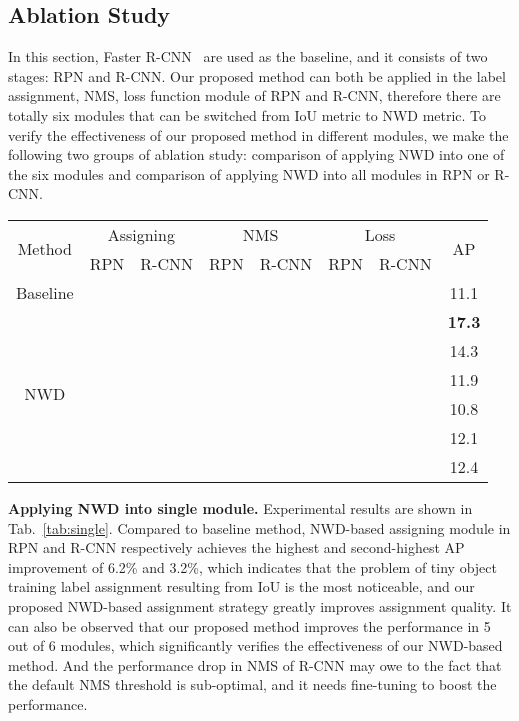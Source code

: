 \documentclass{article}
\begin{document}
\subsection{Ablation Study}
 In this section, Faster R-CNN~\cite{Faster-R-CNN_2015_NIPS} are used as the baseline, and it consists of two stages: RPN and R-CNN. Our proposed method can both be applied in the label assignment, NMS, loss function module of RPN and R-CNN, therefore there are totally six modules that can be switched from IoU metric to NWD metric. To verify the effectiveness of our proposed method in different modules, we make the following two groups of ablation study: comparison of applying NWD into one of the six modules and comparison of applying NWD into all modules in RPN or R-CNN.

\begin{table*}[t]
	\centering
\setlength{\belowcaptionskip}{0.2cm}
	\caption{Ablation experiments when NWD is applied to single module.}
	\begin{tabular}{|c|cc|cc|cc|c|}  
	\hline
	\multirow{2}{*}{Method}  & \multicolumn{2}{c|}{Assigning}  & \multicolumn{2}{c|}{NMS}  & \multicolumn{2}{c|}{Loss} & \multirow{2}{*}{AP} \\
	&  RPN & R-CNN & RPN & R-CNN & RPN & R-CNN & \\
	\hline
	Baseline & & & & & & & 11.1 \\
	\hline
	\multirow{6}{*}{NWD}  & \checkmark &  &  &  &  &  & \textbf{17.3} \\
	                      &  & \checkmark &  &  &  &  & 14.3 \\
	                      &  &  & \checkmark &  &  &  & 11.9 \\
	                      &  &  &  & \checkmark &  &  & 10.8 \\
	                      &  &  &  &  & \checkmark  &  & 12.1 \\
	                      &  &  &  &  &  & \checkmark & 12.4 \\
	\hline
	\end{tabular}
	\label{tab:single}
\end{table*}

\textbf{Applying NWD into single module.} Experimental results are shown in Tab.~\ref{tab:single}. Compared to baseline method, NWD-based assigning module in RPN and R-CNN respectively achieves the highest and second-highest AP improvement of 6.2\% and 3.2\%, which indicates that the problem of tiny object training label assignment resulting from IoU is the most noticeable, and our proposed NWD-based assignment strategy greatly improves assignment quality. It can also be observed that our proposed method improves the performance in 5 out of 6 modules, which significantly verifies the effectiveness of our NWD-based method. And the performance drop in NMS of R-CNN may owe to the fact that the default NMS threshold is sub-optimal, and it needs fine-tuning to boost the performance. 
\end{document}
